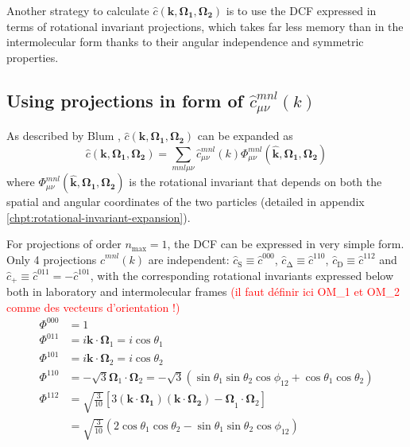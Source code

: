 Another strategy to calculate $\hat{c}(\mathbf{k},\mathbf{\Omega_{1}},\mathbf{\Omega_{2}})$
is to use the DCF expressed in terms of rotational invariant projections,
which takes far less memory than in the intermolecular form thanks
to their angular independence and symmetric properties. 


\subsection{Using projections in form of $\hat{c}_{\mu\nu}^{mnl}(k)$\label{sub:Using-projections-in}}

As described by Blum \citep{Blum_I,Blum_II}, $\hat{c}(\mathbf{k},\mathbf{\Omega_{1}},\mathbf{\Omega_{2}})$
can be expanded as
\begin{equation}
\hat{c}(\mathbf{k},\mathbf{\Omega_{1}},\mathbf{\Omega_{2}})=\sum_{mnl\mu\nu}\hat{c}_{\mu\nu}^{mnl}(k)\Phi_{\mu\nu}^{mnl}(\mathbf{\hat{k}},\mathbf{\Omega_{1}},\mathbf{\Omega_{2}})
\end{equation}
where $\Phi_{\mu\nu}^{mnl}(\mathbf{\hat{k}},\mathbf{\Omega_{1}},\mathbf{\Omega_{2}})$
is the rotational invariant that depends on both the spatial and angular
coordinates of the two particles (detailed in appendix \ref{chpt:rotational-invariant-expansion}).

For projections of order $n{}_{\mathrm{max}}=1$, the DCF can be expressed
in very simple form. Only 4 projections $\hat{c}^{mnl}(k)$ are independent:
$\hat{c}_{\mathrm{S}}\equiv\hat{c}^{000}$, $\hat{c}_{\mathrm{\Delta}}\equiv\hat{c}^{110}$,
$\hat{c}_{\mathrm{D}}\equiv\hat{c}^{112}$ and $\hat{c}_{+}\equiv\hat{c}^{011}=-\hat{c}^{101}$,
with the corresponding rotational invariants expressed below both
in laboratory and intermolecular frames \textcolor{red}{(il faut définir
ici OM\_1 et OM\_2 comme des vecteurs d'orientation !)}
\begin{align}
\Phi^{000} & =1\nonumber \\
\Phi^{011} & =i\mathbf{k}\cdot\mathbf{\Omega}_{1}=i\cos\theta_{1}\nonumber \\
\Phi^{101} & =i\mathbf{k}\cdot\mathbf{\Omega}_{2}=i\cos\theta_{2}\nonumber \\
\Phi^{110} & =-\sqrt{3}\mathbf{\Omega}_{1}\cdot\mathbf{\Omega}_{2}=-\sqrt{3}(\sin\theta_{1}\sin\theta_{2}\cos\phi_{12}+\cos\theta_{1}\cos\theta_{2})\nonumber \\
\Phi^{112} & =\sqrt{\frac{3}{10}}\left[3\mathbf{(\mathbf{k}\cdot\mathbf{\Omega}_{1})(\mathbf{k}\cdot\mathbf{\Omega}_{2})-\Omega}_{1}\cdot\mathbf{\Omega}_{2}\right]\\
 & =\sqrt{\frac{3}{10}}\left(2\cos\theta_{1}\cos\theta_{2}-\sin\theta_{1}\sin\theta_{2}\cos\phi_{12}\right)\nonumber 
\end{align}


